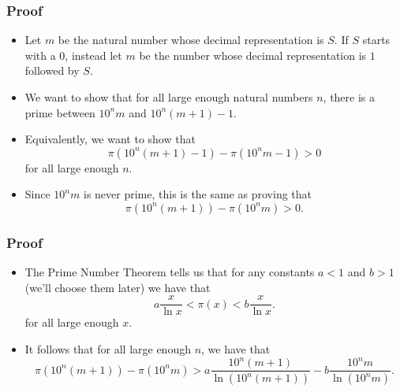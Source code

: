\documentclass{beamer}
\begin{document}
\begin{frame}
    \frametitle{Proof}

    \begin{itemize}
        \item Let $m$ be the natural number whose decimal representation is $S$. If $S$ starts with a $0$, instead let $m$ be the number whose decimal representation is $1$ followed by $S$. \pause
        \item We want to show that for all large enough natural numbers $n$, there is a prime between $10^n m$ and $10^{n} (m + 1) - 1$. \pause
        \item Equivalently, we want to show that
        \[
            \pi\left( 10^{n} (m + 1) - 1\right) - \pi\left( 10^n m - 1 \right) > 0
        \]
        for all large enough $n$. \pause
        \item Since $10^n m$ is never prime, this is the same as proving that
        \[
            \pi\left( 10^{n} (m + 1) \right) - \pi\left( 10^n m \right) > 0.
        \]
    \end{itemize}

\end{frame}

\begin{frame}
    \frametitle{Proof}

    \begin{itemize}
        \item The Prime Number Theorem tells us that for any constants $a < 1$ and $b > 1$ (we'll choose them later) we have that
        \[
            a \frac{x}{\ln x} < \pi(x) < b \frac{x}{\ln x}.
        \]
        for all large enough $x$.
        \pause
        \item It follows that for all large enough $n$, we have that
        \[
            \pi\left( 10^{n} (m + 1) \right) - \pi\left( 10^n m \right) > a \frac{10^{n} (m + 1)}{\ln\left( 10^{n} (m + 1) \right)} - b \frac{10^n m}{\ln\left( 10^n m \right)}.
        \]
    \end{itemize}
\end{frame}
\end{document}
